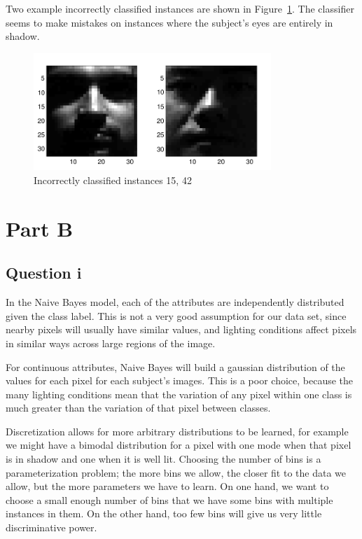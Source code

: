\documentclass[a4paper]{article}
\begin{document}
Two example incorrectly classified instances are shown in Figure~\ref{fig:a5img2}. The classifier seems to make mistakes on instances where the subject's eyes are entirely in shadow.

\begin{figure}[!htbp]
\centering
\includegraphics[width=0.8\textwidth]{A5-incorrect-cropped.pdf}
\caption{Incorrectly classified instances 15, 42}
\label{fig:a5img2}
\end{figure}

\FloatBarrier

\section*{Part B}
\subsection*{Question i}
In the Naive Bayes model, each of the attributes are independently distributed given the class label. This is not a very good assumption for our data set, since nearby pixels will usually have similar values, and lighting conditions affect pixels in similar ways across large regions of the image.

For continuous attributes, Naive Bayes will build a gaussian distribution of the values for each pixel for each subject's images. This is a poor choice, because the many lighting conditions mean that the variation of any pixel within one class is much greater than the variation of that pixel between classes.

Discretization allows for more arbitrary distributions to be learned, for example we might have a bimodal distribution for a pixel with one mode when that pixel is in shadow and one when it is well lit. Choosing the number of bins is a parameterization problem; the more bins we allow, the closer fit to the data we allow, but the more parameters we have to learn. On one hand, we want to choose a small enough number of bins that we have some bins with multiple instances in them. On the other hand, too few bins will give us very little discriminative power.
\end{document}
